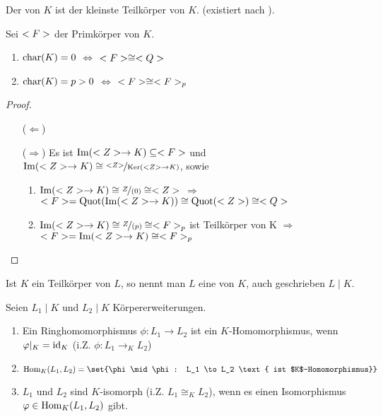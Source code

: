 \begin{definition}[Primkörper]
	Der  von $K$ ist der kleinste Teilkörper von $K$. (existiert nach ).
\end{definition}

\begin{proposition}
	Sei $<F>$ der Primkörper von $K$.
	\begin{enumerate}[label=(\alph*)]
		\item $\operatorname{char}(K)  = 0$ $\Leftrightarrow$ $<F> \cong <Q>$
		\item $\operatorname{char}(K)  = p > 0$ $\Leftrightarrow$ $<F> \cong <F>_p$
	\end{enumerate}
\end{proposition}

\begin{proof}\hspace{0pt}
	\vspace*{\dimexpr-\baselineskip+2\lineskip\relax}
	\begin{itemize}
	\item[($\Leftarrow$)]  %
	\item[($\Rightarrow$)] Es ist $\operatorname{Im}(<Z> \to K) \subseteq <F>$ und $\Image(\Z \to K) \cong \lnkset{\Z}{\Ker(\Z \to K)}$, sowie
		\begin{enumerate}[label=(\alph*)]
			\item $\Image(\Z \to K) \cong \lnkset{Z}{(0)} \cong \Z$ $\Rightarrow$ $<F> = \operatorname{Quot}(\operatorname{Im}(<Z> \to K)) \cong \operatorname{Quot}(<Z>) \cong <Q>$
			\item $\Image(\Z \to K) \cong \lnkset{Z}{(p)} \cong \Fp$ ist Teilkörper von K $\Rightarrow$ $<F> = \operatorname{Im}(<Z> \to K) \cong <F>_p$
		\end{enumerate}
	\end{itemize}
\end{proof}

\begin{definition}[Körpererweiterung]
	Ist $K$ ein Teilkörper von $L$, so nennt man $L$ eine  von $K$, auch geschrieben $L \mid K$.
\end{definition}

\begin{definition}[$K$-Homomorphismus]
	Seien $L_1 \mid K$ und $L_2 \mid K$ Körpererweiterungen.
	\begin{enumerate}[label=(\alph*)]
		\item Ein Ringhomomorphismus $\phi\colon L_1 \to L_2$ ist ein $K$-Homomorphismus, wenn $\varphi\vert_K = \operatorname{id}_K$ (i.Z. $\phi\colon L_1 \to_K L_2$)
		\item $\Hom_K(L_1,L_2) = \set{\phi \mid \phi: L_1 \to L_2 \text{ ist $K$-Homomorphismus}}$
		\item $L_1$ und $L_2$ sind $K$-isomorph (i.Z. $L_1 \cong_K L_2$), wenn es einen Isomorphismus $\varphi \in \operatorname{Hom}_K(L_1, L_2)$ gibt.
	\end{enumerate}
\end{definition}

